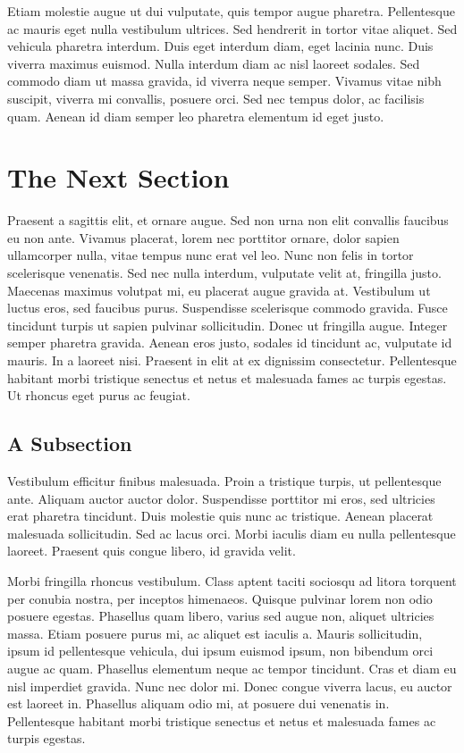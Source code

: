 \documentclass[11pt,]{article}
\begin{document}
Etiam molestie augue ut dui vulputate, quis tempor augue pharetra.
Pellentesque ac mauris eget nulla vestibulum ultrices. Sed hendrerit in
tortor vitae aliquet. Sed vehicula pharetra interdum. Duis eget interdum
diam, eget lacinia nunc. Duis viverra maximus euismod. Nulla interdum
diam ac nisl laoreet sodales. Sed commodo diam ut massa gravida, id
viverra neque semper. Vivamus vitae nibh suscipit, viverra mi convallis,
posuere orci. Sed nec tempus dolor, ac facilisis quam. Aenean id diam
semper leo pharetra elementum id eget justo.

\section{The Next Section}\label{the-next-section}

Praesent a sagittis elit, et ornare augue. Sed non urna non elit
convallis faucibus eu non ante. Vivamus placerat, lorem nec porttitor
ornare, dolor sapien ullamcorper nulla, vitae tempus nunc erat vel leo.
Nunc non felis in tortor scelerisque venenatis. Sed nec nulla interdum,
vulputate velit at, fringilla justo. Maecenas maximus volutpat mi, eu
placerat augue gravida at. Vestibulum ut luctus eros, sed faucibus
purus. Suspendisse scelerisque commodo gravida. Fusce tincidunt turpis
ut sapien pulvinar sollicitudin. Donec ut fringilla augue. Integer
semper pharetra gravida. Aenean eros justo, sodales id tincidunt ac,
vulputate id mauris. In a laoreet nisi. Praesent in elit at ex dignissim
consectetur. Pellentesque habitant morbi tristique senectus et netus et
malesuada fames ac turpis egestas. Ut rhoncus eget purus ac feugiat.

\subsection{A Subsection}\label{a-subsection}

Vestibulum efficitur finibus malesuada. Proin a tristique turpis, ut
pellentesque ante. Aliquam auctor auctor dolor. Suspendisse porttitor mi
eros, sed ultricies erat pharetra tincidunt. Duis molestie quis nunc ac
tristique. Aenean placerat malesuada sollicitudin. Sed ac lacus orci.
Morbi iaculis diam eu nulla pellentesque laoreet. Praesent quis congue
libero, id gravida velit.

Morbi fringilla rhoncus vestibulum. Class aptent taciti sociosqu ad
litora torquent per conubia nostra, per inceptos himenaeos. Quisque
pulvinar lorem non odio posuere egestas. Phasellus quam libero, varius
sed augue non, aliquet ultricies massa. Etiam posuere purus mi, ac
aliquet est iaculis a. Mauris sollicitudin, ipsum id pellentesque
vehicula, dui ipsum euismod ipsum, non bibendum orci augue ac quam.
Phasellus elementum neque ac tempor tincidunt. Cras et diam eu nisl
imperdiet gravida. Nunc nec dolor mi. Donec congue viverra lacus, eu
auctor est laoreet in. Phasellus aliquam odio mi, at posuere dui
venenatis in. Pellentesque habitant morbi tristique senectus et netus et
malesuada fames ac turpis egestas.
\end{document}
